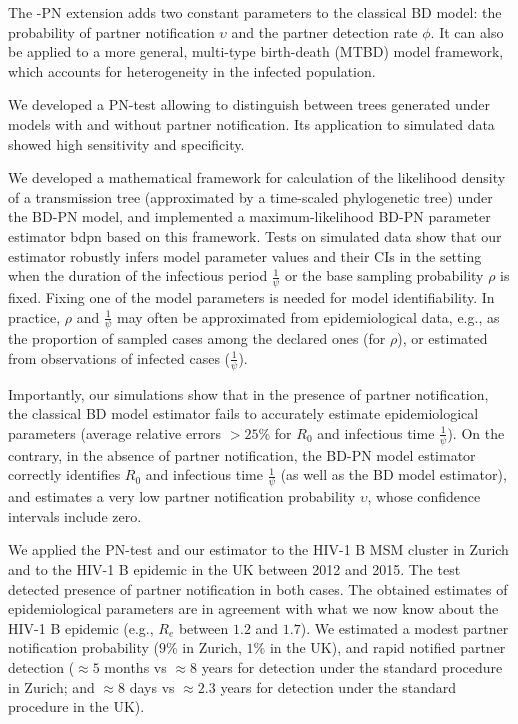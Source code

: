 \documentclass[10pt,letterpaper]{article}
\begin{document}
The -PN extension adds two constant parameters to the classical BD model: the probability of partner notification $\upsilon$ and the partner detection rate $\phi$. It can also be applied to a more general, multi-type birth-death (MTBD) model framework, which accounts for heterogeneity in the infected population. 

We developed a PN-test allowing to distinguish between trees generated under models with and without partner notification. Its application to simulated data showed high sensitivity and specificity. 

We developed a mathematical framework for calculation of the likelihood density of a transmission tree (approximated by a time-scaled phylogenetic tree) under the BD-PN model, and implemented a maximum-likelihood BD-PN parameter estimator bdpn based on this framework. %
Tests on simulated data show that our estimator robustly infers model parameter values and their CIs in the setting when the duration of the infectious period $\frac{1}{\psi}$ or the base sampling probability $\rho$ is fixed. Fixing one of the model parameters is needed for model identifiability. In practice, $\rho$ and $\frac{1}{\psi}$ may often be approximated from epidemiological data, e.g., as the proportion of sampled cases among the declared ones (for $\rho$), or estimated from observations of infected cases ($\frac{1}{\psi}$). 

Importantly, our simulations show that in the presence of partner notification, the classical BD model estimator fails to accurately estimate epidemiological parameters (average relative errors $> 25\%$ for $R_0$ and infectious time $\frac{1}{\psi}$). On the contrary, in the absence of partner notification, the BD-PN model estimator correctly identifies $R_0$ and infectious time $\frac{1}{\psi}$ (as well as the BD model estimator), and estimates a very low partner notification probability $\upsilon$, whose confidence intervals include zero.

We applied the PN-test and our estimator to the HIV-1 B MSM cluster in Zurich and to the HIV-1 B epidemic in the UK between 2012 and 2015. The test detected presence of partner notification in both cases. The obtained estimates of epidemiological parameters are in agreement with what we now know about the HIV-1 B epidemic (e.g., $R_e$ between $1.2$ and $1.7$). We estimated a modest partner notification probability ($9\%$ in Zurich, $1\%$ in the UK), and rapid notified partner detection ($\approx 5$ months vs $\approx  8$ years for detection under the standard procedure in Zurich; and $\approx 8$ days vs $\approx 2.3$ years for detection under the standard procedure in the UK).
\end{document}
